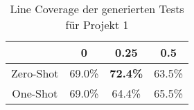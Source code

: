 \bgroup
\def\arraystretch{2}
\begin{table}[H]
	\vspace{.5cm}
	\centering		
	\begin{center}
		\begin{tabular}{|c||c|c|c|}
			\hline 
			& 0 & 0.25 & 0.5 \\
			\hline 
			\hline
			Zero-Shot & 69.0\% & \textbf{72.4\%} & 63.5\% \\
			\hline
			One-Shot & 69.0\% & 64.4\% & 65.5\% \\
			\hline
		\end{tabular} 
	\end{center}
	\caption{Line Coverage der generierten Tests für Projekt 1}
	\label{fig:line-1}
	\vspace{-.8cm}
\end{table}
\egroup